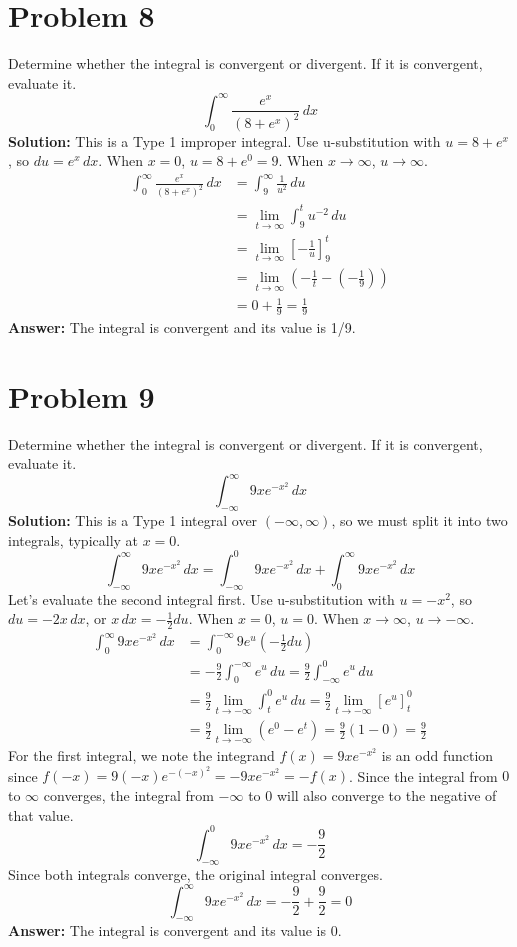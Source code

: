 \documentclass{article}
\begin{document}
\section{Problem 8}
Determine whether the integral is convergent or divergent. If it is convergent, evaluate it.
\[ \int_{0}^{\infty} \frac{e^x}{(8+e^x)^2} \,dx \]
\textbf{Solution:}
This is a Type 1 improper integral. Use u-substitution with $u = 8+e^x$, so $du = e^x \,dx$.
When $x=0$, $u=8+e^0 = 9$. When $x \to \infty$, $u \to \infty$.
\begin{align*}
    \int_{0}^{\infty} \frac{e^x}{(8+e^x)^2} \,dx &= \int_{9}^{\infty} \frac{1}{u^2} \,du \\
    &= \lim_{t \to \infty} \int_{9}^{t} u^{-2} \,du \\
    &= \lim_{t \to \infty} \left[ -\frac{1}{u} \right]_{9}^{t} \\
    &= \lim_{t \to \infty} \left( -\frac{1}{t} - \left(-\frac{1}{9}\right) \right) \\
    &= 0 + \frac{1}{9} = \frac{1}{9}
\end{align*}
\textbf{Answer:} The integral is convergent and its value is 1/9.

\section{Problem 9}
Determine whether the integral is convergent or divergent. If it is convergent, evaluate it.
\[ \int_{-\infty}^{\infty} 9xe^{-x^2} \,dx \]
\textbf{Solution:}
This is a Type 1 integral over $(-\infty, \infty)$, so we must split it into two integrals, typically at $x=0$.
\[ \int_{-\infty}^{\infty} 9xe^{-x^2} \,dx = \int_{-\infty}^{0} 9xe^{-x^2} \,dx + \int_{0}^{\infty} 9xe^{-x^2} \,dx \]
Let's evaluate the second integral first. Use u-substitution with $u = -x^2$, so $du = -2x\,dx$, or $x\,dx = -\frac{1}{2}du$.
When $x=0$, $u=0$. When $x \to \infty$, $u \to -\infty$.
\begin{align*}
    \int_{0}^{\infty} 9xe^{-x^2} \,dx &= \int_{0}^{-\infty} 9 e^u \left(-\frac{1}{2}du\right) \\
    &= -\frac{9}{2} \int_{0}^{-\infty} e^u \,du = \frac{9}{2} \int_{-\infty}^{0} e^u \,du \\
    &= \frac{9}{2} \lim_{t \to -\infty} \int_{t}^{0} e^u \,du = \frac{9}{2} \lim_{t \to -\infty} [e^u]_t^0 \\
    &= \frac{9}{2} \lim_{t \to -\infty} (e^0 - e^t) = \frac{9}{2}(1-0) = \frac{9}{2}
\end{align*}
For the first integral, we note the integrand $f(x) = 9xe^{-x^2}$ is an odd function since $f(-x) = 9(-x)e^{-(-x)^2} = -9xe^{-x^2} = -f(x)$. Since the integral from $0$ to $\infty$ converges, the integral from $-\infty$ to $0$ will also converge to the negative of that value.
\[ \int_{-\infty}^{0} 9xe^{-x^2} \,dx = -\frac{9}{2} \]
Since both integrals converge, the original integral converges.
\[ \int_{-\infty}^{\infty} 9xe^{-x^2} \,dx = -\frac{9}{2} + \frac{9}{2} = 0 \]
\textbf{Answer:} The integral is convergent and its value is 0.
\end{document}
